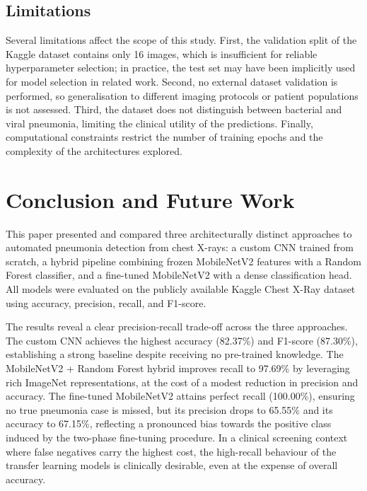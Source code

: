 \documentclass[conference]{IEEEtran}
\begin{document}
\subsection{Limitations}

Several limitations affect the scope of this study. First,
the validation split of the Kaggle dataset contains only 16
images, which is insufficient for reliable hyperparameter
selection; in practice, the test set may have been implicitly
used for model selection in related work. Second, no external
dataset validation is performed, so generalisation to
different imaging protocols or patient populations is not
assessed. Third, the dataset does not distinguish between
bacterial and viral pneumonia, limiting the clinical utility
of the predictions. Finally, computational constraints
restrict the number of training epochs and the complexity
of the architectures explored.

\section{Conclusion and Future Work}
\label{sec:conclusion}

This paper presented and compared three architecturally
distinct approaches to automated pneumonia detection from
chest X-rays: a custom CNN trained from scratch, a hybrid
pipeline combining frozen MobileNetV2 features with a
Random Forest classifier, and a fine-tuned MobileNetV2 with
a dense classification head. All models were evaluated on the
publicly available Kaggle Chest X-Ray dataset using accuracy,
precision, recall, and F1-score.

The results reveal a clear precision-recall trade-off across
the three approaches. The custom CNN achieves the highest
accuracy (82.37\%) and F1-score (87.30\%), establishing a
strong baseline despite receiving no pre-trained knowledge.
The MobileNetV2 + Random Forest hybrid improves recall to
97.69\% by leveraging rich ImageNet representations, at the
cost of a modest reduction in precision and accuracy.
The fine-tuned MobileNetV2 attains perfect recall (100.00\%),
ensuring no true pneumonia case is missed, but its precision
drops to 65.55\% and its accuracy to 67.15\%, reflecting a
pronounced bias towards the positive class induced by the
two-phase fine-tuning procedure. In a clinical screening
context where false negatives carry the highest cost, the
high-recall behaviour of the transfer learning models is
clinically desirable, even at the expense of overall accuracy.
\end{document}
